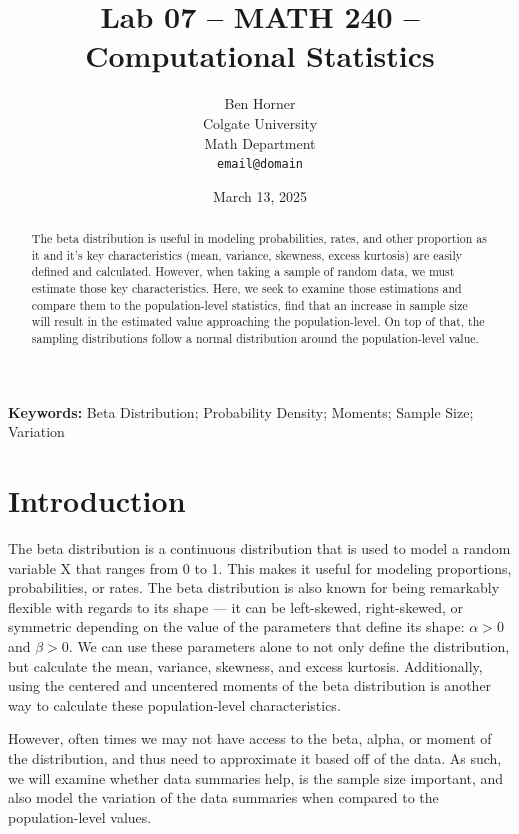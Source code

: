 \documentclass{article}\usepackage[]{graphicx}\usepackage[]{xcolor}
\begin{document}
\vspace{-1in}
\title{Lab 07 -- MATH 240 -- Computational Statistics}

\author{
  Ben Horner \\
  Colgate University  \\
  Math Department  \\
  {\tt email@domain}
}

\date{March 13, 2025}

\maketitle

\begin{multicols}{2}
\begin{abstract}
The beta distribution is useful in modeling probabilities, rates, and other proportion as it and it's key characteristics (mean, variance, skewness, excess kurtosis) are easily defined and calculated. However, when taking a sample of random data, we must estimate those key characteristics. Here, we seek to examine those estimations and compare them to the population-level statistics, find that an increase in sample size will result in the estimated value approaching the population-level. On top of that, the sampling distributions follow a normal distribution around the population-level value.
\end{abstract}

\noindent \textbf{Keywords:} Beta Distribution; Probability Density; Moments; Sample Size; Variation

\section{Introduction}
The beta distribution is a continuous distribution that is used to model a random variable X that ranges from 0 to 1. This makes it useful for modeling proportions, probabilities, or rates. The beta distribution is also known for being remarkably flexible with regards to its shape --- it can be left-skewed, right-skewed, or symmetric depending on the value of the parameters that define its shape: $\alpha > 0$ and $\beta > 0$. We can use these parameters alone to not only define the distribution, but calculate the mean, variance, skewness, and excess kurtosis. Additionally, using the centered and uncentered moments of the beta distribution is another way to calculate these population-level characteristics.

However, often times we may not have access to the beta, alpha, or moment of the distribution, and thus need to approximate it based off of the data. As such, we will examine whether data summaries help, is the sample size important, and also model the variation of the data summaries when compared to the population-level values. 



\end{multicols}
\end{document}
